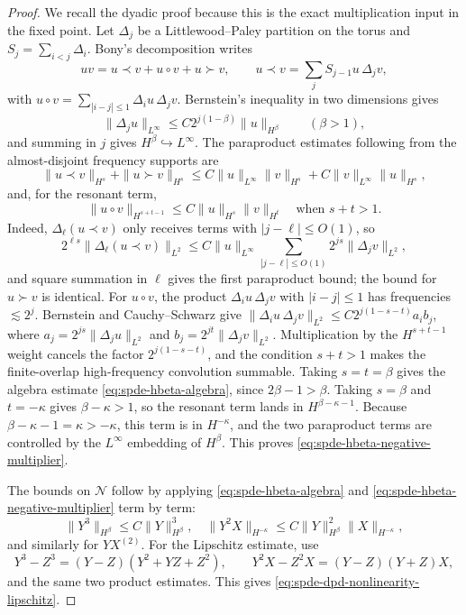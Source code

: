 \begin{proof}
We recall the dyadic proof because this is the exact multiplication input in
the fixed point.  Let \(\Delta_j\) be a Littlewood--Paley partition on the
torus and \(S_j=\sum_{i<j}\Delta_i\).  Bony's decomposition writes
\[
  uv=u\prec v+u\circ v+u\succ v,
  \qquad
  u\prec v=\sum_j S_{j-1}u\,\Delta_jv ,
\]
with \(u\circ v=\sum_{|i-j|\leq1}\Delta_i u\,\Delta_jv\).  Bernstein's
inequality in two dimensions gives
\begin{equation}
  \|\Delta_j u\|_{L^\infty}\leq C2^{j(1-\beta)}\|u\|_{H^\beta}
  \qquad(\beta>1),
  \label{eq:spde-bernstein-hbeta-linfty-block}
\end{equation}
and summing in \(j\) gives \(H^\beta\hookrightarrow L^\infty\).  The
paraproduct estimates following from the almost-disjoint frequency supports
are
\begin{equation}
  \|u\prec v\|_{H^s}+\|u\succ v\|_{H^s}
  \leq C\|u\|_{L^\infty}\|v\|_{H^s}
       +C\|v\|_{L^\infty}\|u\|_{H^s},
\end{equation}
and, for the resonant term,
\begin{equation}
  \|u\circ v\|_{H^{s+t-1}}
  \leq C\|u\|_{H^s}\|v\|_{H^t}
  \quad\text{when }s+t>1 .
  \label{eq:spde-resonant-product-estimate}
\end{equation}
Indeed, \(\Delta_\ell(u\prec v)\) only receives terms with
\(|j-\ell|\leq O(1)\), so
\[
  2^{\ell s}\|\Delta_\ell(u\prec v)\|_{L^2}
  \leq
  C\|u\|_{L^\infty}
  \sum_{|j-\ell|\leq O(1)}2^{js}\|\Delta_jv\|_{L^2},
\]
and square summation in \(\ell\) gives the first paraproduct bound; the
bound for \(u\succ v\) is identical.  For \(u\circ v\), the product
\(\Delta_i u\,\Delta_j v\) with \(|i-j|\leq1\) has frequencies
\(\lesssim 2^j\).  Bernstein and Cauchy--Schwarz give
\(\|\Delta_i u\,\Delta_jv\|_{L^2}\leq
C2^{j(1-s-t)}a_ib_j\), where
\(a_j=2^{js}\|\Delta_j u\|_{L^2}\) and
\(b_j=2^{jt}\|\Delta_jv\|_{L^2}\).  Multiplication by the
\(H^{s+t-1}\) weight cancels the factor \(2^{j(1-s-t)}\), and the condition
\(s+t>1\) makes the finite-overlap high-frequency convolution summable.
Taking \(s=t=\beta\) gives the algebra estimate
\eqref{eq:spde-hbeta-algebra}, since \(2\beta-1>\beta\).  Taking
\(s=\beta\) and \(t=-\kappa\) gives
\(\beta-\kappa>1\), so the resonant term lands in
\(H^{\beta-\kappa-1}\).  Because \(\beta-\kappa-1=\kappa>-\kappa\), this
term is in \(H^{-\kappa}\), and the two paraproduct terms are controlled by
the \(L^\infty\) embedding of \(H^\beta\).  This proves
\eqref{eq:spde-hbeta-negative-multiplier}.

The bounds on \(\mathcal N\) follow by applying
\eqref{eq:spde-hbeta-algebra} and
\eqref{eq:spde-hbeta-negative-multiplier} term by term:
\[
  \|Y^3\|_{H^\beta}\leq C\|Y\|_{H^\beta}^3,
  \quad
  \|Y^2X\|_{H^{-\kappa}}\leq C\|Y\|_{H^\beta}^2\|X\|_{H^{-\kappa}},
\]
and similarly for \(YX^{(2)}\).  For the Lipschitz estimate, use
\[
  Y^3-Z^3=(Y-Z)(Y^2+YZ+Z^2),
  \qquad
  Y^2X-Z^2X=(Y-Z)(Y+Z)X,
\]
and the same two product estimates.  This gives
\eqref{eq:spde-dpd-nonlinearity-lipschitz}.
\end{proof}

